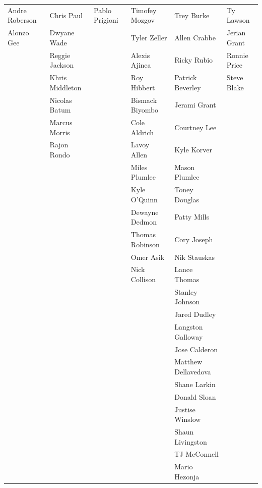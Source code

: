 \documentclass{article}
\begin{document}
\begin{table}[ht]
{\begin{tabular}{llllll}
  Andre Roberson & Chris Paul & Pablo Prigioni & Timofey Mozgov & Trey Burke & Ty Lawson \\ 
  Alonzo Gee & Dwyane Wade &  & Tyler Zeller & Allen Crabbe & Jerian Grant \\ 
   & Reggie Jackson &  & Alexis Ajinca & Ricky Rubio & Ronnie Price \\ 
   & Khris Middleton &  & Roy Hibbert & Patrick Beverley & Steve Blake \\ 
   & Nicolas Batum &  & Bismack Biyombo & Jerami Grant &  \\ 
   & Marcus Morris &  & Cole Aldrich & Courtney Lee &  \\ 
   & Rajon Rondo &  & Lavoy Allen & Kyle Korver &  \\ 
   &  &  & Miles Plumlee & Mason Plumlee &  \\ 
   &  &  & Kyle O'Quinn & Toney Douglas &  \\ 
   &  &  & Dewayne Dedmon & Patty Mills &  \\ 
   &  &  & Thomas Robinson & Cory Joseph &  \\ 
   &  &  & Omer Asik & Nik Stauskas &  \\ 
   &  &  & Nick Collison & Lance Thomas &  \\ 
   &  &  &  & Stanley Johnson &  \\ 
   &  &  &  & Jared Dudley &  \\ 
   &  &  &  & Langston Galloway &  \\ 
   &  &  &  & Jose Calderon &  \\ 
   &  &  &  & Matthew Dellavedova &  \\ 
   &  &  &  & Shane Larkin &  \\ 
   &  &  &  & Donald Sloan &  \\ 
   &  &  &  & Justise Winslow &  \\ 
   &  &  &  & Shaun Livingston &  \\ 
   &  &  &  & TJ McConnell &  \\ 
   &  &  &  & Mario Hezonja &  \\ 
   \hline
\end{tabular}%
}
\end{table}
\end{document}

